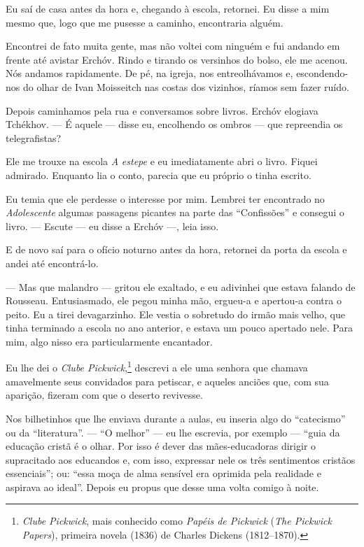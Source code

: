 Eu saí de casa antes da hora e, chegando à escola, retornei. Eu disse a
mim mesmo que, logo que me pusesse a caminho, encontraria alguém.

Encontrei de fato muita gente, mas não voltei com ninguém e fui andando
em frente até avistar Erchóv. Rindo e tirando os versinhos do bolso, ele
me acenou. Nós andamos rapidamente. De pé, na igreja, nos entreolhávamos
e, escondendo-nos do olhar de Ivan Moisseitch nas costas dos vizinhos,
ríamos sem fazer ruído.

Depois caminhamos pela rua e conversamos sobre livros. Erchóv elogiava
Tchékhov. --- É aquele --- disse eu, encolhendo os ombros --- que
repreendia os telegrafistas?

Ele me trouxe na escola \emph{A} \emph{estepe} e eu imediatamente abri o
livro. Fiquei admirado. Enquanto lia o conto, parecia que eu próprio o
tinha escrito.

Eu temia que ele perdesse o interesse por mim. Lembrei ter encontrado no
\emph{Adolescente} algumas passagens picantes na parte das
``Confissões'' e consegui o livro. --- Escute --- eu disse a Erchóv ---,
leia isso.

E de novo saí para o ofício noturno antes da hora, retornei da porta da
escola e andei até encontrá-lo.

--- Mas que malandro --- gritou ele exaltado, e eu adivinhei que estava
falando de Rousseau. Entusiasmado, ele pegou minha mão, ergueu-a e
apertou-a contra o peito. Eu a tirei devagarzinho. Ele vestia o
sobretudo do irmão mais velho, que tinha terminado a escola no ano
anterior, e estava um pouco apertado nele. Para mim, algo nisso era
particularmente encantador.

Eu lhe dei o \emph{Clube Pickwick},\footnote{\emph{Clube Pickwick}, mais
  conhecido como \emph{Papéis de Pickwick} (\emph{The Pickwick Papers}),
  primeira novela (1836) de Charles Dickens (1812--1870).} descrevi a
ele uma senhora que chamava amavelmente seus convidados para petiscar, e
aqueles anciões que, com sua aparição, fizeram com que o deserto
revivesse.

Nos bilhetinhos que lhe enviava durante a aulas, eu inseria algo do
``catecismo'' ou da ``literatura''. --- ``O melhor'' --- eu lhe
escrevia, por exemplo --- ``guia da educação cristã é o olhar. Por isso
é dever das mães-educadoras dirigir o supracitado aos educandos e, com
isso, expressar nele os três sentimentos cristãos essenciais''; ou:
``essa moça de alma sensível era oprimida pela realidade e aspirava ao
ideal''. Depois eu propus que desse uma volta comigo à noite.

